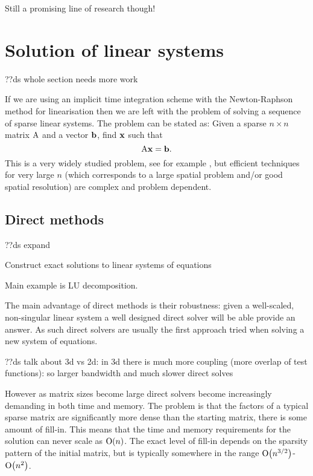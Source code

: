 Still a promising line of research though!



\section{Solution of linear systems}
\label{sec:solution-lin-sys}

??ds whole section needs more work

If we are using an implicit time integration scheme with the Newton-Raphson method for linearisation then we are left with the problem of solving a sequence of sparse linear systems.
The problem can be stated as: Given a sparse $n \times n $ matrix $\mathrm{A}$ and a vector ${\boldsymbol{\mathrm{b}}}$, find $\boldsymbol{\mathrm{x}}$ such that
\begin{equation}
  \label{eq:linear-system}
  \mathrm{A} \boldsymbol{\mathrm{x}} = {\boldsymbol{\mathrm{b}}}.
\end{equation}
This is a very widely studied problem, see for example \cite{Saad2000}, but efficient techniques for very large $n$ (which corresponds to a large spatial problem and/or good spatial resolution) are complex and problem dependent.


\subsection{Direct methods}
\label{sec:direct-methods}

??ds expand

Construct exact solutions to linear systems of equations

Main example is LU decomposition.

The main advantage of direct methods is their robustness: given a well-scaled, non-singular linear system a well designed direct solver will be able provide an answer.
As such direct solvers are usually the first approach tried when solving a new system of equations.

??ds talk about 3d vs 2d: in 3d there is much more coupling (more overlap of test functions): so larger bandwidth and much slower direct solves

However as matrix sizes become large direct solvers become increasingly demanding in both time and memory.
The problem is that the factors of a typical sparse matrix are significantly more dense than the starting matrix, \ie there is some amount of fill-in.
This means that the time and memory requirements for the solution can never scale as $\mathrm{O}{\left( n \right)}$.
The exact level of fill-in depends on the sparsity pattern of the initial matrix, but is typically somewhere in the range $\mathrm{O}{\left( n^{3/2} \right)}$-$\mathrm{O}{\left( n^2 \right)}$.


